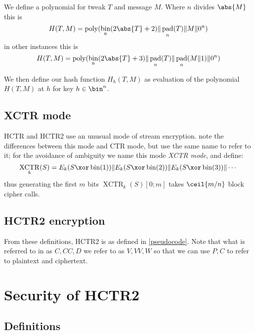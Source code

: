 \documentclass[letterpaper,11pt]{article}
\newcommand*{\Concat}{\Vert}
\DeclareMathOperator{\fromint}{bin}
\DeclareMathOperator{\pad}{pad}
\DeclareMathOperator{\poly}{poly}
\DeclareMathOperator{\XCTR}{XCTR}
\begin{document}
We define a polynomial for tweak \(T\) and message \(M\). Where \(n\) divides
\(\abs{M}\) this is
\begin{displaymath}
    H(T, M) = \poly(\fromint_{n}(2\abs{T} + 2) \Concat \pad_n(T) \Concat M \Concat 0^n)
\end{displaymath}
in other instances this is
\begin{displaymath}
    H(T, M) = \poly(\fromint_{n}(2\abs{T} + 3) \Concat \pad_n(T) \Concat \pad_n(M \Concat 1) \Concat 0^n)
\end{displaymath}

We then define our hash function \(H_h(T, M)\) as evaluation
of the polynomial \(H(T, M)\) at \(h\) for key \(h \in \bin^n\).

\subsection{XCTR mode}

HCTR and HCTR2 use an unusual mode of stream encryption.
\cite{hctr,hctrquad} note the differences between this mode and CTR mode,
but use the same name to refer to it; for the avoidance of ambiguity
we name this mode \emph{XCTR mode}, and define:
\begin{displaymath}
    \XCTR_k(S) = E_k(S \xor \fromint(1)) \Concat E_k(S \xor \fromint(2)) \Concat E_k(S \xor \fromint(3)) \Concat \cdots
\end{displaymath}
thus generating the first \(m\) bits \(\XCTR_k(S)[0; m]\) takes \(\ceil{m/n}\) block cipher calls.

\subsection{HCTR2 encryption}

From these definitions, HCTR2 is as defined in \autoref{pseudocode}.
Note that what is referred to in \cite{hctr,hctrquad} as \(C, \mathit{CC}, D\)
we refer to as \(V, VV, W\)
so that we can use \(P, C\) to refer to plaintext and ciphertext.

\section{Security of HCTR2}

\subsection{Definitions}
\end{document}
